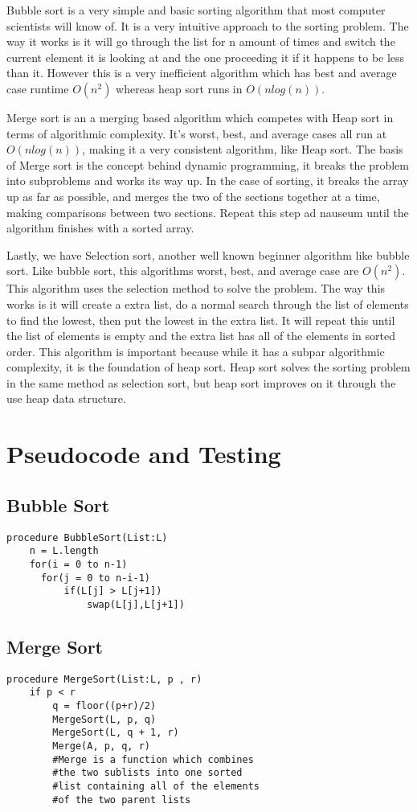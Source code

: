 \documentclass{article}
\begin{document}
Bubble sort is a very simple and basic sorting algorithm that most computer scientists will know of. It is a very intuitive approach to the sorting problem. The way it works is it will go through the list for n amount of times and switch the current element it is looking at and the one proceeding it if it happens to be less than it. However this is a very inefficient algorithm which has best and average case runtime $O(n^2)$ whereas heap sort runs in $O(nlog(n))$.

Merge sort is an a merging based algorithm which competes with Heap sort in terms of algorithmic complexity. It's worst, best, and average cases all run at $O(nlog(n))$, making it a very consistent algorithm, like Heap sort. The basis of Merge sort is the concept behind dynamic programming, it breaks the problem into subproblems and works its way up. In the case of sorting, it breaks the array up as far as possible, and merges the two of the sections together at a time, making comparisons between two sections. Repeat this step ad nauseum until the algorithm finishes with a sorted array.

Lastly, we have Selection sort, another well known beginner algorithm like bubble sort. Like bubble sort, this algorithms worst, best, and average case are $O(n^2)$. This algorithm uses the selection method to solve the problem. The way this works is it will create a extra list, do a normal search through the list of elements to find the lowest, then put the lowest in the extra list. It will repeat this until the list of elements is empty and the extra list has all of the elements in sorted order. This algorithm is important because while it has a subpar algorithmic complexity, it is the foundation of heap sort. Heap sort solves the sorting problem in the same method as selection sort, but heap sort improves on it through the use heap data structure.

\section{Pseudocode and Testing}
\subsection{Bubble Sort}
\begin{lstlisting}
procedure BubbleSort(List:L)
	n = L.length
	for(i = 0 to n-1)
	  for(j = 0 to n-i-1)
		  if(L[j] > L[j+1])
			  swap(L[j],L[j+1])
\end{lstlisting}
\newpage
\subsection{Merge Sort}
\begin{lstlisting}
procedure MergeSort(List:L, p , r)
	if p < r
		q = floor((p+r)/2)
		MergeSort(L, p, q)
		MergeSort(L, q + 1, r)
		Merge(A, p, q, r) 
		#Merge is a function which combines
		#the two sublists into one sorted
		#list containing all of the elements
		#of the two parent lists
\end{lstlisting}
\end{document}
